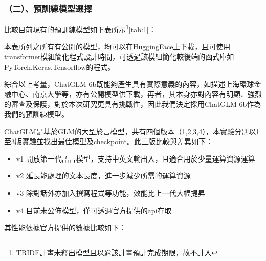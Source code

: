 \documentclass[8pt,a4paper,新細明體,UTF8,natbib]{article}
\begin{document}
\begin{CJK*}{UTF8}{bsmi}
	\subsubsection{（二）、預訓練模型選擇}
	比較目前現有的預訓練模型如下表所示\footnote{TRIDE計畫未釋出模型且以逾該計畫預計完成期限，故不計入}\ref{tab:1}：
	\begin{table}[H]
		\caption{表一、比較及評估預訓練模型}%
		\label{tab:1}
	\end{table}
	本表所列之所有有公開的模型，均可以在HuggingFace上下載，且可使用transformer模組簡化程式設計時間，可透過該模組簡化較後端的函式庫如PyTorch,Keras,Tensorflow的程式。%

	綜合以上考量，ChatGLM-6b既能夠產生具有實際意義的內容，如描述上海環球金融中心、南京大學等，亦有公開模型供下載，再者，其本身亦對內容有明顯、強烈的審查及保護，對於本次研究更具有挑戰性，因此我們決定採用ChatGLM-6b作為我們的預訓練模型。


	ChatGLM是基於GLM的大型於言模型，共有四個版本（1,2,3,4），本實驗分別以1至3版實驗並找出最佳模型及checkpoint。此三版比較與差異如下：
	\begin{itemize}
		\item v1 開放第一代語言模型，支持中英文輸出入，且適合用於少量運算資源運算
		\item v2 延長能處理的文本長度，進一步減少所需的運算資源
		\item v3 除對話外亦加入撰寫程式等功能，效能比上一代大幅提昇
		\item v4 目前未公佈模型，僅可透過官方提供的api存取
	\end{itemize}
	其性能依據官方提供的數據比較如下：
	

\end{CJK*}
\end{document}
